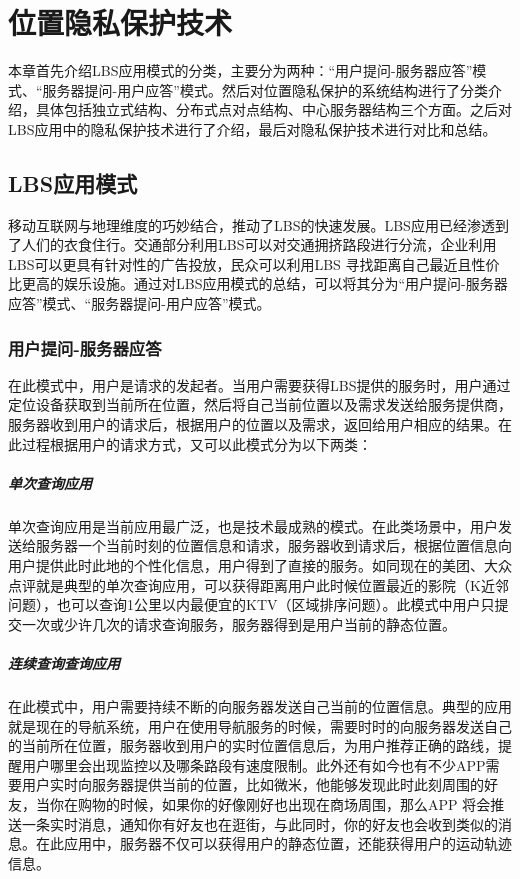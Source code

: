 \chapter{位置隐私保护技术}
\label{chap1}
本章首先介绍LBS应用模式的分类，主要分为两种：“用户提问-服务器应答”模式、“服务器提问-用户应答”模式\cite{zhanghao}。然后对位置隐私保护的系统结构进行了分类介绍，具体包括独立式结构、分布式点对点结构、中心服务器结构三个方面。之后对LBS应用中的隐私保护技术进行了介绍，最后对隐私保护技术进行对比和总结。
\section{LBS应用模式}
移动互联网与地理维度的巧妙结合，推动了LBS的快速发展。LBS应用已经渗透到了人们的衣食住行。交通部分利用LBS可以对交通拥挤路段进行分流，企业利用LBS可以更具有针对性的广告投放，民众可以利用LBS 寻找距离自己最近且性价比更高的娱乐设施。通过对LBS应用模式的总结，可以将其分为“用户提问-服务器应答”模式、“服务器提问-用户应答”模式。
\subsection{用户提问-服务器应答}
在此模式中，用户是请求的发起者。当用户需要获得LBS提供的服务时，用户通过定位设备获取到当前所在位置，然后将自己当前位置以及需求发送给服务提供商，服务器收到用户的请求后，根据用户的位置以及需求，返回给用户相应的结果。在此过程根据用户的请求方式，又可以此模式分为以下两类：
\paragraph{单次查询应用}
单次查询应用是当前应用最广泛，也是技术最成熟的模式。在此类场景中，用户发送给服务器一个当前时刻的位置信息和请求，服务器收到请求后，根据位置信息向用户提供此时此地的个性化信息，用户得到了直接的服务。如同现在的美团、大众点评就是典型的单次查询应用，可以获得距离用户此时候位置最近的影院（K近邻问题），也可以查询1公里以内最便宜的KTV（区域排序问题）。此模式中用户只提交一次或少许几次的请求查询服务，服务器得到是用户当前的静态位置。
\paragraph{连续查询查询应用}
在此模式中，用户需要持续不断的向服务器发送自己当前的位置信息。典型的应用就是现在的导航系统，用户在使用导航服务的时候，需要时时的向服务器发送自己的当前所在位置，服务器收到用户的实时位置信息后，为用户推荐正确的路线，提醒用户哪里会出现监控以及哪条路段有速度限制。此外还有如今也有不少APP需要用户实时向服务器提供当前的位置，比如微米，他能够发现此时此刻周围的好友，当你在购物的时候，如果你的好像刚好也出现在商场周围，那么APP 将会推送一条实时消息，通知你有好友也在逛街，与此同时，你的好友也会收到类似的消息。在此应用中，服务器不仅可以获得用户的静态位置，还能获得用户的运动轨迹信息。

